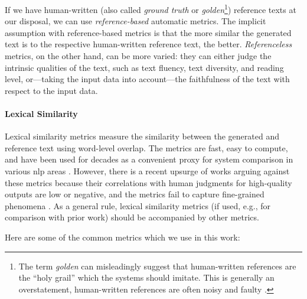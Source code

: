 {If we have human-written (also called \emph{ground truth} or \emph{golden}\footnote{The term \emph{golden} can misleadingly suggest that human-written references are the ``holy grail'' which the systems should imitate. This is generally an overstatement, human-written references are often noisy and faulty \cite{dusekSemanticNoiseMatters2019,clarkAllThatHuman2021}.}) reference texts at our disposal, we can use \emph{reference-based}  automatic metrics. The implicit assumption with reference-based metrics is that the more similar the generated text is to the respective human-written reference text, the better. \emph{Referenceless} metrics, on the other hand, can be more varied: they can either judge the intrinsic qualities of the text, such as text fluency, text diversity, and reading level, or---taking the input data into account---the faithfulness of the text with respect to the input data.


\paragraph{Lexical Similarity} Lexical similarity metrics measure the similarity between the generated and reference text using word-level overlap. The metrics are fast, easy to compute, and have been used for decades as a convenient proxy for system comparison in various \ac{nlp} areas \cite{celikyilmazEvaluationTextGeneration2021}. However, there is a recent upsurge of works arguing against these metrics because their correlations with human judgments for high-quality outputs are low or negative, and the metrics fail to capture fine-grained phenomena \cite{mathurTangledBLEUReevaluating2020,kocmiShipNotShip2021,gehrmannRepairingCrackedFoundation2022}. As a general rule, lexical similarity metrics (if used, e.g., for comparison with prior work) should be accompanied by other metrics.

Here are some of the common metrics which we use in this work:

}
